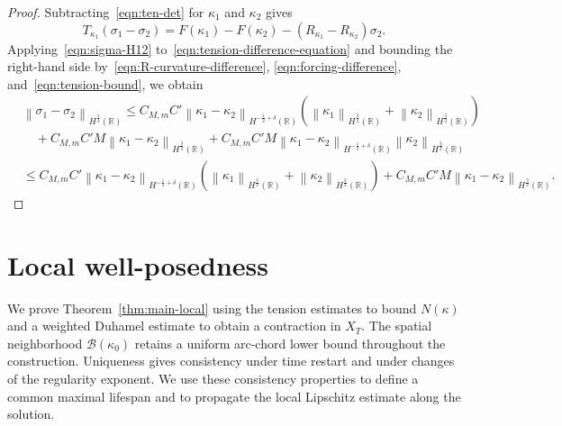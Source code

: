 \documentclass[11pt,reqno]{amsart}
\theoremstyle{plain}
\theoremstyle{definition}
\numberwithin{equation}{section}
\newcommand{\paren}[1]{\left(#1\right)}
\newcommand{\mc}[1]{\mathcal{#1}}
\newcommand{\norm}[1]{\left\lVert #1 \right\rVert}
\newcommand{\R}{\mathbb{R}}
\newcommand{\hr}[1]{H^{#1}(\R)}
\begin{document}
\begin{proof}
Subtracting~\eqref{eqn:ten-det} for $\kappa_1$ and $\kappa_2$ gives
\begin{equation}\label{eqn:tension-difference-equation}
    T_{\kappa_1}\paren{\sigma_1-\sigma_2}
    =F(\kappa_1)-F(\kappa_2)
    -\paren{R_{\kappa_1}-R_{\kappa_2}}\sigma_2.
\end{equation}
Applying~\eqref{eqn:sigma-H12} to~\eqref{eqn:tension-difference-equation}
and bounding the right-hand side
by~\eqref{eqn:R-curvature-difference}, \eqref{eqn:forcing-difference},
and~\eqref{eqn:tension-bound}, we obtain
\begin{equation}
\begin{aligned}
    &\norm{\sigma_1-\sigma_2}_{\hr{\frac{1}{2}}} \le C_{M,m}C'
    \norm{\kappa_1-\kappa_2}_{\hr{-\frac{1}{2}+\delta}} \paren{ \norm{\kappa_1}_{\hr{\frac{3}{2}}}
    +\norm{\kappa_2}_{\hr{\frac{3}{2}}} } \\
    &\quad+ C_{M,m}C'M \norm{\kappa_1-\kappa_2}_{\hr{\frac{3}{2}}} + C_{M,m}C' M
    \norm{\kappa_1-\kappa_2}_{\hr{-\frac{1}{2}+\delta}} \norm{\kappa_2}_{\hr{\frac{3}{2}}} \\
    &\le C_{M,m}C' \norm{\kappa_1-\kappa_2}_{\hr{-\frac{1}{2}+\delta}} \paren{
    \norm{\kappa_1}_{\hr{\frac{3}{2}}} +\norm{\kappa_2}_{\hr{\frac{3}{2}}} } + C_{M,m}C'M
    \norm{\kappa_1-\kappa_2}_{\hr{\frac{3}{2}}}.
\end{aligned}
\end{equation}
\end{proof}


\section{Local well-posedness}
\label{sec:local-theory}

We prove Theorem~\ref{thm:main-local} using the tension estimates to bound
$N(\kappa)$ and a weighted Duhamel estimate to obtain a contraction in
$X_T$. The spatial neighborhood $\mc B(\kappa_0)$ retains a uniform
arc-chord lower bound throughout the construction. Uniqueness gives
consistency under time restart and under changes of the regularity exponent.
We use these consistency properties to define a common maximal lifespan
and to propagate the local Lipschitz estimate along the solution.
\end{document}
